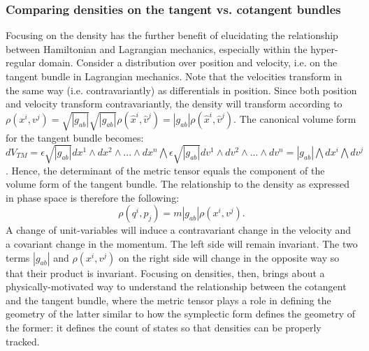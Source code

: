 \documentclass[letterpaper]{article}
\begin{document}
\subsubsection{Comparing densities on the tangent vs. cotangent bundles}
\label{comparing}


Focusing on the density has the further benefit of elucidating the relationship between Hamiltonian and Lagrangian mechanics, especially within the hyper-regular domain. Consider a distribution over position and velocity, i.e. on the tangent bundle in Lagrangian mechanics. Note that the velocities transform in the same way (i.e. contravariantly) as differentials in position. Since both position and velocity transform contravariantly, the density will transform according to $\rho(x^i, v^j) = \sqrt{|g_{ab}|} \sqrt{|g_{ab}|} \rho(\hat{x}^i, \hat{v}^j) = |g_{ab}| \rho(\hat{x}^i, \hat{v}^j)$. The canonical volume form for the tangent bundle becomes: $dV_{TM} = \epsilon \sqrt{|g_{ab}|} dx^1 \wedge dx^2 \wedge ... \wedge dx^n \bigwedge \epsilon \sqrt{|g_{ab}|} dv^1 \wedge dv^2 \wedge ... \wedge dv^n = |g_{ab}| \bigwedge dx^i \bigwedge dv^j$. Hence, the determinant of the metric tensor equals the component of the volume form of the tangent bundle. The relationship to the density as expressed in phase space is therefore the following:
\begin{equation}
	\rho(q^i, p_j) = m |g_{ab}| \rho(x^i, v^j).
\end{equation}
A change of unit-variables will induce a contravariant change in the velocity and a covariant change in the momentum. The left side will remain invariant. The two terms $|g_{ab}|$ and  $\rho(x^i, v^j)$ on the right side will change in the opposite way so that their product is invariant. Focusing on densities, then, brings about a physically-motivated way to understand the relationship between the cotangent and the tangent bundle, where the metric tensor plays a role in defining the geometry of the latter similar to how the symplectic form defines the geometry of the former: it defines the count of states so that densities can be properly tracked.
\end{document}

